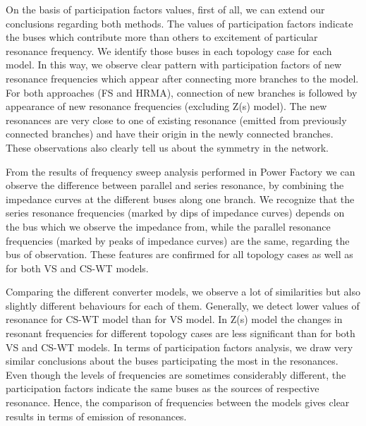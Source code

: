 \documentclass[a4paper,11pt,oneside]{report} %
\begin{document}
On the basis of participation factors values, first of all, we can extend our conclusions regarding both methods. The values of participation factors indicate the buses which contribute more than others to excitement of particular resonance frequency. We identify those buses in each topology case for each model. In this way, we observe clear pattern with participation factors of new resonance frequencies which appear after connecting more branches to the model. For both approaches (FS and HRMA), connection of new branches is followed by appearance of new resonance frequencies (excluding Z(s) model). The new resonances are very close to one of existing resonance (emitted from previously connected branches) and have their origin in the newly connected branches. These observations also clearly tell us about the symmetry in the network.

From the results of frequency sweep analysis performed in Power Factory we can observe the difference between parallel and series resonance, by combining the impedance curves at the different buses along one branch. We recognize that the series resonance frequencies (marked by dips of impedance curves) depends on the bus which we observe the impedance from, while the parallel resonance frequencies (marked by peaks of impedance curves) are the same, regarding the bus of observation. These features are confirmed for all topology cases as well as for both VS and CS-WT models.

Comparing the different converter models, we observe a lot of similarities but also slightly different behaviours for each of them. Generally, we detect lower values of resonance for CS-WT model than for VS model. In Z(s) model the changes in resonant frequencies for different topology cases are less significant than for both VS and CS-WT models. In terms of participation factors analysis, we draw very similar conclusions about the buses participating the most in the resonances. Even though the levels of frequencies are sometimes considerably different, the participation factors indicate the same buses as the sources of respective resonance. Hence, the comparison of frequencies between the models gives clear results in terms of emission of resonances.
\end{document}
